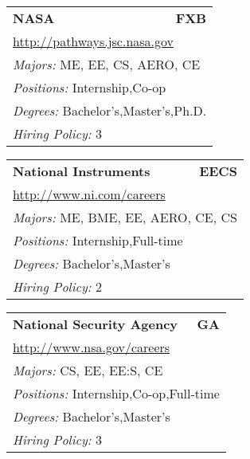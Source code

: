 \documentclass[twoside]{article}
\begin{document}
\begin{center}
\begin{multicols}{3}
\begin{FlushLeft}
\begin{minipage}{.9\columnwidth}
\end{minipage}
 
\begin{minipage}{.9\columnwidth}\begin{tabularx}{.95\columnwidth}{Xr}
                 {\Large\bf NASA} & {\Large\bf FXB}\\
    \multicolumn{2}{p{.95\columnwidth}}{\url{http://pathways.jsc.nasa.gov}}\\
    \multicolumn{2}{p{.95\columnwidth}}{\emph{Majors:} ME, EE, CS, AERO, CE}\\
    \multicolumn{2}{p{.95\columnwidth}}{\emph{Positions:} Internship,Co-op}\\
    \multicolumn{2}{p{.95\columnwidth}}{\emph{Degrees:} Bachelor's,Master's,Ph.D.}\\
    \multicolumn{2}{p{.95\columnwidth}}{\emph{Hiring Policy:} 3}\\
    \end{tabularx}
    
\end{minipage}
 
\begin{minipage}{.9\columnwidth}\begin{tabularx}{.95\columnwidth}{Xr}
                 {\Large\bf National Instruments} & {\Large\bf EECS}\\
    \multicolumn{2}{p{.95\columnwidth}}{\url{http://www.ni.com/careers}}\\
    \multicolumn{2}{p{.95\columnwidth}}{\emph{Majors:} ME, BME, EE, AERO, CE, CS}\\
    \multicolumn{2}{p{.95\columnwidth}}{\emph{Positions:} Internship,Full-time}\\
    \multicolumn{2}{p{.95\columnwidth}}{\emph{Degrees:} Bachelor's,Master's}\\
    \multicolumn{2}{p{.95\columnwidth}}{\emph{Hiring Policy:} 2}\\
    \end{tabularx}
    
\end{minipage}
 
\begin{minipage}{.9\columnwidth}\begin{tabularx}{.95\columnwidth}{Xr}
                 {\Large\bf National Security Agency} & {\Large\bf GA}\\
    \multicolumn{2}{p{.95\columnwidth}}{\url{http://www.nsa.gov/careers}}\\
    \multicolumn{2}{p{.95\columnwidth}}{\emph{Majors:} CS, EE, EE:S, CE}\\
    \multicolumn{2}{p{.95\columnwidth}}{\emph{Positions:} Internship,Co-op,Full-time}\\
    \multicolumn{2}{p{.95\columnwidth}}{\emph{Degrees:} Bachelor's,Master's}\\
    \multicolumn{2}{p{.95\columnwidth}}{\emph{Hiring Policy:} 3}\\
    \end{tabularx}
    

\end{minipage}
\end{FlushLeft}
\end{multicols}
\end{center}
\end{document}
